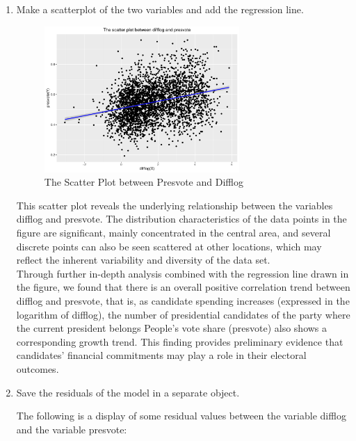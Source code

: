 \documentclass[12pt,letterpaper]{article}
\begin{document}
\begin{enumerate}
		\item Make a scatterplot of the two variables and add the regression line. 	\vspace{1cm}
		
		\begin{figure}[h!]
			\caption{\footnotesize{The Scatter Plot between Presvote and Difflog}}
			\vspace{.5cm}
			\centering
			\label{fig:2.2}
			\includegraphics[width=0.7\textwidth]{difflog_presvote_scatterplot.pdf}
		\end{figure}
		\vspace{9cm}
		This scatter plot reveals the underlying relationship between the variables difflog and presvote. The distribution characteristics of the data points in the figure are significant, mainly concentrated in the central area, and several discrete points can also be seen scattered at other locations, which may reflect the inherent variability and diversity of the data set.\\
		Through further in-depth analysis combined with the regression line drawn in the figure, we found that there is an overall positive correlation trend between difflog and presvote, that is, as candidate spending increases (expressed in the logarithm of difflog), the number of presidential candidates of the party where the current president belongs People’s vote share (presvote) also shows a corresponding growth trend. This finding provides preliminary evidence that candidates’ financial commitments may play a role in their electoral outcomes.\\
		
		\item Save the residuals of the model in a separate object.	\vspace{1cm}
		
		The following is a display of some residual values between the variable difflog and the variable presvote:\\
		

\end{enumerate}
\end{document}
